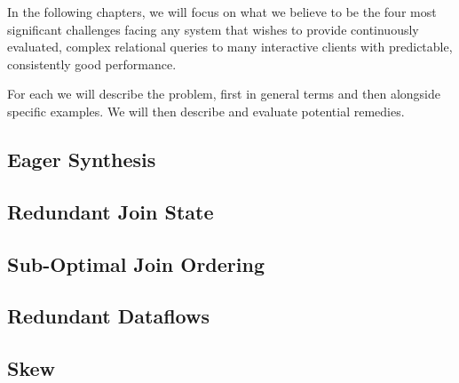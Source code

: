 \documentclass[../index.tex]{subfiles}
\begin{document}
In the following chapters, we will focus on what we believe to be the
four most significant challenges facing any system that wishes to
provide continuously evaluated, complex relational queries to many
interactive clients with predictable, consistently good performance.

For each we will describe the problem, first in general terms and then
alongside specific examples. We will then describe and evaluate
potential remedies.

\subsection{Eager Synthesis} \label{case-eagerness}


\subsection{Redundant Join State} \label{case-join-state}


\subsection{Sub-Optimal Join Ordering} \label{case-join-ordering}


\subsection{Redundant Dataflows} \label{case-redundant-dataflows}


\subsection{Skew} \label{case-skew} \label{case-skew}

\end{document}
